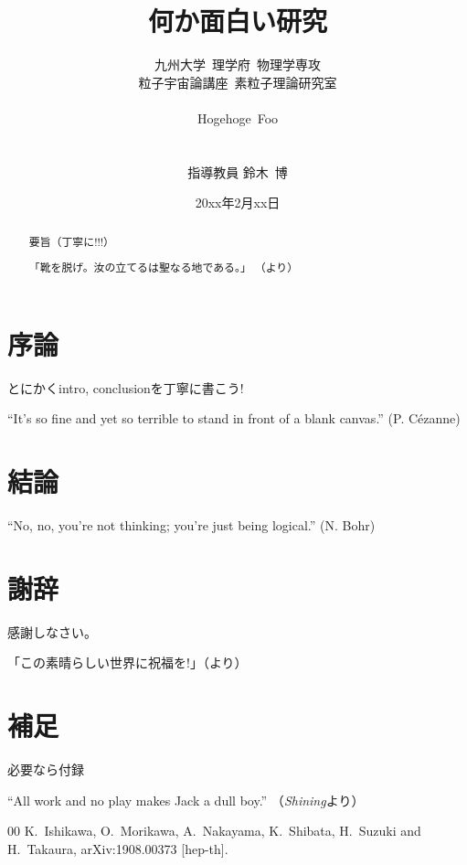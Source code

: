 \documentclass[dvipdfmx,a4j,twoside,openright]{jsbook}
\title{何か面白い研究}
\author{九州大学~理学府~物理学専攻\\
粒子宇宙論講座~素粒子理論研究室\\
\\
Hogehoge~Foo\\%
\\\\
指導教員\hspace{3mm}
鈴木~博}
\date{20xx年2月xx日}%
\numberwithin{equation}{chapter}
\begin{document}
\maketitle
\cleardoublepage
{}
\begin{abstract}
 \begin{center}
 \end{center}
 
 要旨（丁寧に!!!）

「靴を脱げ。汝の立てるは聖なる地である。」 （より）
\end{abstract}
\tableofcontents
\newpage
{}

\chapter{序論}
とにかくintro, conclusionを丁寧に書こう!

``It's so fine and yet so terrible to stand in front of a blank canvas.'' (P. C\'ezanne)

\chapter{結論}
``No, no, you're not thinking; you're just being logical.'' (N. Bohr)


\chapter*{謝辞}
感謝しなさい。

「この素晴らしい世界に祝福を!」（より）


\appendix
\chapter{補足}
必要なら付録

``All work and no play makes Jack a dull boy.'' （\textit{Shining}より）


\begin{thebibliography}{00}
  K.~Ishikawa, O.~Morikawa, A.~Nakayama, K.~Shibata, H.~Suzuki and H.~Takaura,
  arXiv:1908.00373 [hep-th].
\end{thebibliography}

%
%
\end{document}
